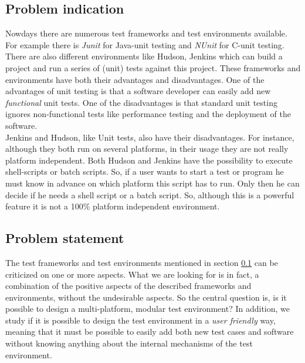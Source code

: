 \documentclass{article}
\newcommand{\CS}{C\nolinebreak\hspace{-.05em}\raisebox{.6ex}{\bf \#}}
\begin{document}
\subsection{Problem indication}
\label{subsec:Problemindication}
Nowdays there are numerous test frameworks and test environments available. For example there is \emph{Junit}\cite{Junit} for Java-unit testing and \emph{NUnit}\cite{Nunit} for \CS{}-unit testing.
There are also different environments like Hudson\cite{HudsonDoc}\cite{Hudson}, Jenkins\cite{JenkinsDoc} which can build a project and run a series of (unit) tests against this project. 
These frameworks and environments have both their advantages and disadvantages. One of the advantages of unit testing is that a software developer can easily add new \emph{functional} unit tests.
One of the disadvantages is that standard unit testing ignores non-functional tests like performance testing and the deployment of the software.\\

\noindent Jenkins and Hudson, like Unit tests, also have their
disadvantages. For instance, although they both run on several platforms, in their usage they are not really platform independent. Both Hudson and Jenkins have the possibility to execute shell-scripts or 
batch scripts. So, if a user wants to start a test or program he must know in advance on which platform this script has to run. Only then he can decide if he needs a shell script or a batch script. So, although 
this is a powerful feature it is not a 100\% platform independent environment.
 
\subsection{Problem statement}
\label{subsec:Problemstatement}
The test frameworks and test environments mentioned in section \ref{subsec:Problemindication} can be criticized on one or more aspects. What we are looking for is in fact, a combination
of the positive aspects of the described frameworks and environments, without the undesirable aspects. So the central question is, is it possible to design a
multi-platform, modular test environment? In addition, we study if it is possible to design the test environment in a \emph{user friendly} way, meaning that it must
be possible to easily add both new test cases and software without knowing anything about the internal mechanisms of the test environment.\\
\end{document}
